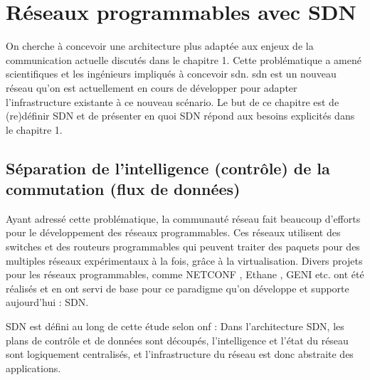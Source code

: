 \chapter{Réseaux programmables avec SDN}

On cherche à concevoir une architecture plus adaptée aux enjeux de la communication actuelle discutés dans le chapitre 1. Cette problématique a amené scientifiques et les ingénieurs impliqués à concevoir \gls{sdn}. \gls{sdn} est un nouveau  réseau qu'on est actuellement en cours de développer pour adapter l'infrastructure existante à ce nouveau scénario.
Le but de ce chapitre est de (re)définir SDN et de présenter en quoi SDN répond aux besoins explicités dans le chapitre 1.


\section{Séparation de l'intelligence (contrôle) de la commutation (flux de données)}

Ayant adressé cette problématique, la communauté réseau fait beaucoup d'efforts pour le développement des réseaux programmables. Ces réseaux utilisent des switches et des routeurs programmables qui peuvent traiter des paquets pour des multiples réseaux expérimentaux  à la fois, grâce à la \gls{virtualisation}. \cite{OpenFlowStanfordOssification} Divers projets pour les réseaux programmables, comme NETCONF \cite{NETCONF}, Ethane \cite{Ethane}, GENI \cite{GENI} etc. ont été réalisés et en ont servi de base pour ce paradigme qu'on développe et supporte aujourd'hui : SDN. 


SDN est défini au long de cette étude  selon \gls{onf} : Dans l'architecture SDN, les plans de contrôle et de données sont découpés, l'intelligence et l'état du réseau sont logiquement centralisés, et l'infrastructure du réseau est donc abstraite des applications. \cite{SDNNewNormONFExecutiveSummary}


